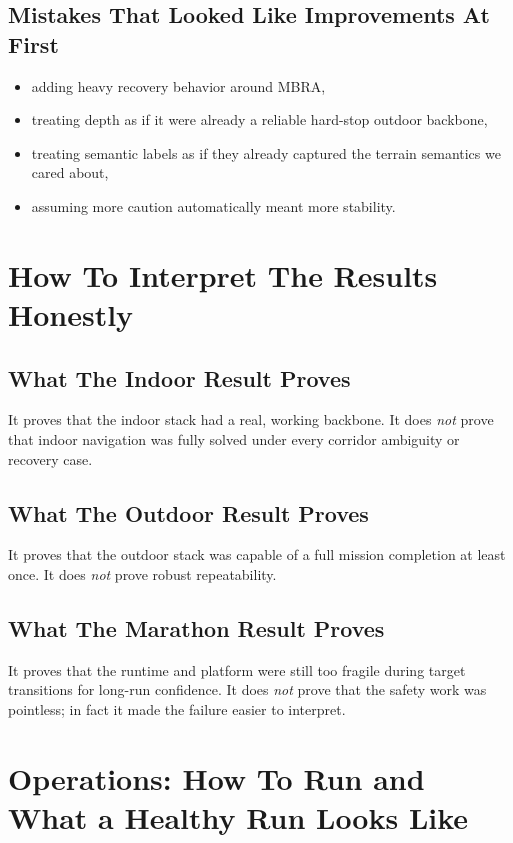 \documentclass[11pt]{article}
\begin{document}
\subsection{Mistakes That Looked Like Improvements At First}

\begin{itemize}[nosep]
  \item adding heavy recovery behavior around MBRA,
  \item treating depth as if it were already a reliable hard-stop outdoor backbone,
  \item treating semantic labels as if they already captured the terrain semantics we
  cared about,
  \item assuming more caution automatically meant more stability.
\end{itemize}

\section{How To Interpret The Results Honestly}

\subsection{What The Indoor Result Proves}

It proves that the indoor stack had a real, working backbone. It does \emph{not}
prove that indoor navigation was fully solved under every corridor ambiguity or
recovery case.

\subsection{What The Outdoor Result Proves}

It proves that the outdoor stack was capable of a full mission completion at least
once. It does \emph{not} prove robust repeatability.

\subsection{What The Marathon Result Proves}

It proves that the runtime and platform were still too fragile during target
transitions for long-run confidence. It does \emph{not} prove that the safety work
was pointless; in fact it made the failure easier to interpret.

\section{Operations: How To Run and What a Healthy Run Looks Like}
\end{document}
